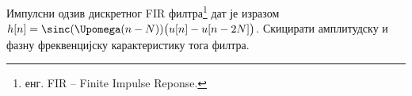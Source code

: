 \PID
Импулсни одзив дискретног FIR филтра\footnote{енг. FIR -- Finite Impulse Reponse.} дат је изразом 
$h[n] = \sinc(\Upomega (n-N)) \big(  u[n] - u[n - 2N] \big)$. Скицирати амплитудску и фазну 
фреквенцијску карактеристику тога филтра. 